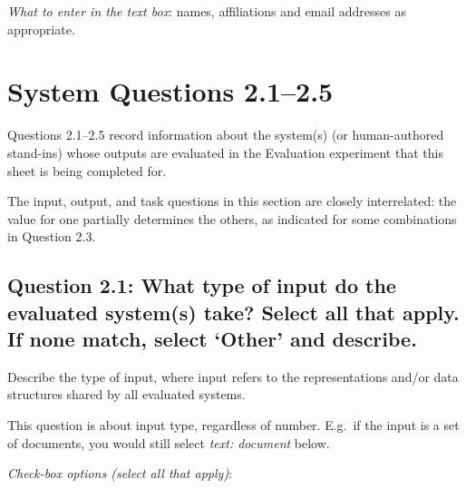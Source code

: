 \documentclass[11pt,a4paper]{article}
\begin{document}
\noindent\textit{What to enter in the text box}: names, affiliations and email addresses as appropriate. 



\section{System Questions 2.1--2.5}\label{sec:system}

Questions 2.1--2.5 record information about the system(s) (or human-authored stand-ins) whose outputs are evaluated in the Evaluation experiment that this sheet is being completed for.

The input, output, and task questions in this section are closely interrelated: the value for one partially determines the others, as indicated for some combinations in Question 2.3. 


\vspace{-.3cm}
\subsection*{Question 2.1: What type of input do the evaluated system(s) take? Select all that apply. If none match, select `Other' and describe.}\label{sec:input}
\vspace{-.1cm}

Describe the type of input, where input refers to the representations and/or data structures shared by all evaluated systems. 

This question is about input type, regardless of number. E.g.\ if the input is a set of documents, you would still select \textit{text: document} below. 

\vspace{.3cm}
\noindent\textit{Check-box options (select all that apply)}: 
\vspace{-.1cm}
\end{document}
